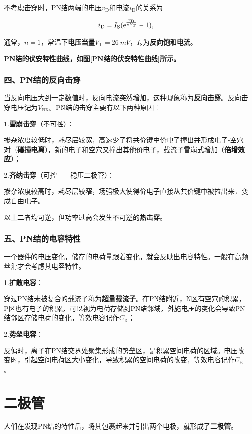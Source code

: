 不考虑击穿时，PN结两端的电压$v_\mathrm{D}$和电流$i_\mathrm{D}$的关系为

\begin{equation}
    i_{\mathrm{D}}=I_{\mathrm{S}}(\mathrm{e}^{\frac{v_\mathrm{D}}{nV_\mathrm{T}}}-1),
\end{equation}

通常，$n=1$，常温下\textbf{电压当量}$V_\mathrm{T}=\qty{26}{mV}$，$I_{\mathrm{S}}$为\textbf{反向饱和电流}。

\textbf{PN结的伏安特性曲线，如图\ref{PN结的伏安特性曲线}所示。}

\subsubsection{四、PN结的反向击穿}
当反向电压大到一定数值时，反向电流突然增加，这种现象称为\textbf{反向击穿}。反向击穿电压记为$V_\mathrm{BR}$。PN结的击穿主要有以下两种原因：

1.\textbf{雪崩击穿}（不可控）：

掺杂浓度较低时，耗尽层较宽，高速少子将共价键中价电子撞出并形成电子-空穴对（\textbf{碰撞电离}），新的电子和空穴又撞出其他价电子，载流子雪崩式增加（\textbf{倍增效应}）；

2.\textbf{齐纳击穿}（可控——稳压二极管）：

掺杂浓度较高时，耗尽层较窄，场强极大使得价电子直接从共价键中被拉出来，变成自由电子。

以上二者均可逆，但功率过高会发生不可逆的\textbf{热击穿}。

\subsubsection{五、PN结的电容特性}
一个器件的电压变化，储存的电荷量跟着变化，就会反映出电容特性。一般在高频丝滑才会考虑其电容特性。

1.\textbf{扩散电容}：

穿过PN结未被复合的载流子称为\textbf{超量载流子}。在PN结附近，N区有空穴的积累，P区也有电子的积累，可以视为电荷存储到PN结邻域，外施电压的变化会导致PN结邻区存储电荷的变化，等效电容记作$C_\mathrm{D}$；

2.\textbf{势垒电容}：

反偏时，离子在PN结交界处聚集形成的势垒区，是积累空间电荷的区域。电压改变时，引起空间电荷区大小变化，导致积累的空间电荷的改变，等效电容记作$C_\mathrm{B}$。

\section{二极管}
人们在发现PN结的特性后，将其包裹起来并引出两个电极，就形成了\textbf{二极管}。
